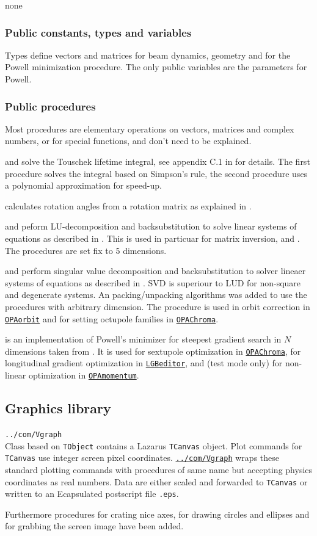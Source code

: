 \documentclass[12pt]{article}
\newcommand\code[1]{{\tt #1}}
\newcommand\guifco[1]{{\color{violet}\code{#1}}}
\newcommand{\unico}[1]{{\color{burntorange}\code{#1}}}
\newcommand{\opagui}[1]{\colorbox{blue!20}{\code{#1}}}
\newcommand{\ogui}[1]{\hyperref[#1]{\opagui{#1}}}
\newcommand{\opaguif}[1]{\colorbox{violet!30}{\code{#1}}}
\newcommand{\oguifh}[2]{\subsection{\label{#2}#1}{\Huge\opaguif{#2}}\\}
\newcommand{\oguif}[1]{\hyperref[#1]{\opaguif{#1}}}
\newcommand{\uses}[1]{\flushleft {\bf Uses:} #1}
\newcommand{\desc}[1]{#1}
\newcommand{\pvar}[1]{\subsubsection*{Public constants, types and variables} #1}
\newcommand{\ppro}[1]{\subsubsection*{Public procedures} #1}
\begin{document}
\uses{none}

\pvar{
Types define vectors and matrices for beam dynamics, geometry and for the Powell minimization procedure. The only public variables are the parameters for Powell. 
}

\ppro{
Most procedures are elementary operations on vectors, matrices and complex numbers, or for special functions, and don't need to be explained.

\unico{CTouschek} and \unico{CTouschek\_pol} solve the Touschek lifetime integral, see appendix C.1 in \cite{inside} for details. The first procedure solves the integral based on Simpson's rule, the second procedure uses a polynomial approximation for speed-up. 

\unico{EulerAng} calculates rotation angles from a rotation matrix as explained in \cite{euler}.

\unico{LUDCMP} and \unico{LUBKSB} peform LU-decomposition and backsubstitution to solve linear systems of equations as described in \cite{numrec}. This is used in particuar for matrix inversion, \unico{MatInv} and \unico{MatDet}. The procedures are set fix to 5 dimensions.


\unico{svdcmp} and \unico{svbksb} perform singular value decomposition and backsubstitution to solver lineaer systems of equations as described in \cite{numrec}. SVD is superiour to LUD for non-square and degenerate systems. An packing/unpacking algorithms was added to use the procedures with arbitrary dimension. The procedure is used in orbit correction in \ogui{OPAorbit} and for setting octupole families in \ogui{OPAChroma}.

\unico{Powell} is an implementation of Powell's minimizer for steepest gradient search in $N$ dimensions taken from \cite{numrec}. It is used for sextupole optimization in \ogui{OPAChroma}, for longitudinal gradient optimization in \ogui{LGBeditor}, and (test mode only) for non-linear optimization in \ogui{OPAmomentum}.
}

\oguifh{Graphics library}{../com/Vgraph}

\desc{
Class \guifco{Vplot} based on \code{TObject} contains a Lazarus \code{TCanvas} object. Plot commands for \code{TCanvas}  use integer screen pixel coordinates. \oguif{../com/Vgraph} wraps these standard plotting commands with procedures of same name but accepting physics coordinates as real numbers. Data are either scaled and forwarded to \code{TCanvas}  or written to an Ecapsulated postscript file \code{*.eps}.

Furthermore procedures for crating nice axes, for drawing circles and ellipses and for grabbing the screen image have been added.
}
\end{document}

